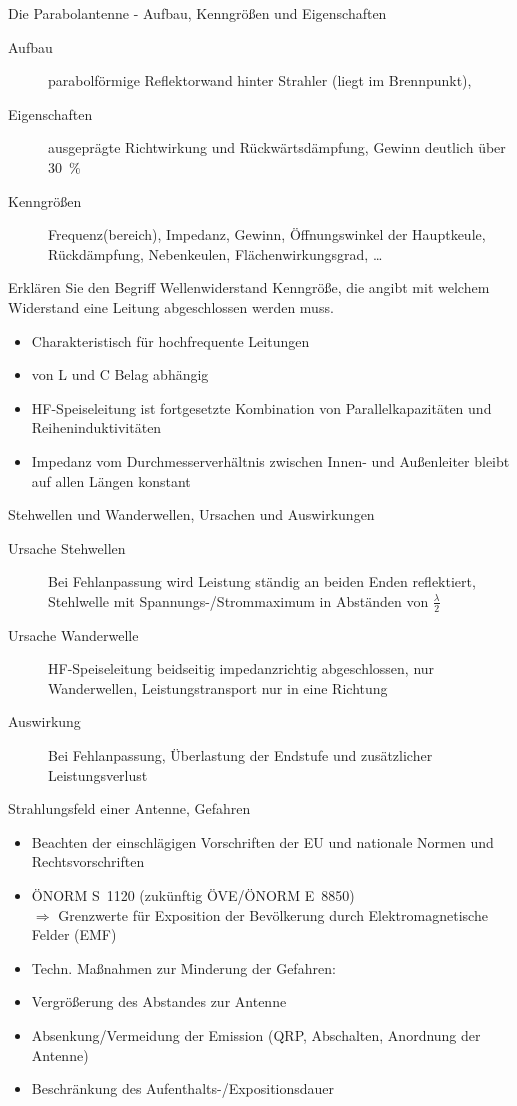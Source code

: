 \documentclass[avery5371,grid,frame,a4paper]{flashcards}
\newcommand{\card}[3]{
  \begin{flashcard}[{\chap} -- #1]{#2}#3\end{flashcard}
}
\begin{document}
\card{70}{Die Parabolantenne - Aufbau, Kenngrößen und Eigenschaften}{
  \begin{description}
    \item[Aufbau]
      parabolförmige Reflektorwand hinter Strahler (liegt im Brennpunkt),
    \item[Eigenschaften]
      ausgeprägte Richtwirkung und Rückwärtsdämpfung,
      Gewinn deutlich über \SI{30}{\percent}
    \item[Kenngrößen]
      Frequenz(bereich), Impedanz, Gewinn, Öffnungswinkel der Hauptkeule,
      Rückdämpfung, Nebenkeulen, Flächenwirkungsgrad, \dots
  \end{description}
}
\card{71}{Erklären Sie den Begriff Wellenwiderstand}{
  \small
  Kenngröße, die angibt mit welchem Widerstand eine Leitung abgeschlossen werden muss.

  \begin{itemize}\itemsep0pt
    \item Charakteristisch für hochfrequente Leitungen
    \item von L und C Belag abhängig
    \item HF-Speiseleitung ist fortgesetzte Kombination von Parallelkapazitäten und Reiheninduktivitäten
    \item Impedanz vom Durchmesserverhältnis zwischen Innen- und Außenleiter bleibt auf allen Längen konstant
  \end{itemize}
}
\card{72}{Stehwellen und Wanderwellen, Ursachen und Auswirkungen}{
  \small
  \begin{description}
    \item[Ursache Stehwellen]
      Bei Fehlanpassung wird Leistung ständig an beiden Enden reflektiert,
      Stehlwelle mit Spannungs-/Strommaximum in Abständen von $\frac\lambda2$
    \item[Ursache Wanderwelle]
      HF-Speiseleitung beidseitig impedanzrichtig abgeschlossen,
      nur Wanderwellen, Leistungstransport nur in eine Richtung
    \item[Auswirkung]
      Bei Fehlanpassung, Überlastung der Endstufe und zusätzlicher Leistungsverlust
  \end{description}
}
\card{73}{Strahlungsfeld einer Antenne, Gefahren}{
  \small
  \begin{itemize} \itemsep0pt
    \item Beachten der einschlägigen Vorschriften der EU und nationale Normen und Rechtsvorschriften
    \item ÖNORM S~1120 (zukünftig ÖVE/ÖNORM E~8850) \\
          $\Rightarrow$ Grenzwerte für Exposition der Bevölkerung durch Elektromagnetische Felder (EMF)
    \item Techn. Maßnahmen zur Minderung der Gefahren:
  \end{itemize}
  \begin{itemize}[label=*] \itemsep0pt
    \item Vergrößerung des Abstandes zur Antenne %
    \item Absenkung/Vermeidung der Emission (QRP, Abschalten, Anordnung der Antenne)
    \item Beschränkung des Aufenthalts-/Expositionsdauer
  \end{itemize}
}
\end{document}
